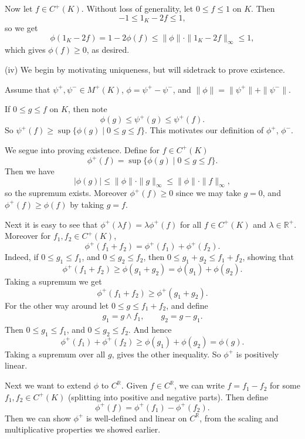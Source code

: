 \documentclass[12pt]{article}
\begin{document}
\begin{proofbox}
	Now let $f \in C^{+}(K)$. Without loss of generality, let $0 \leq f \leq 1$ on $K$. Then
	\[
	-1 \leq 1_K - 2f \leq 1,
	\]
	so we get
	\[
	\phi(1_K - 2f) = 1 - 2 \phi(f) \leq \|\phi\| \cdot \|1_K - 2f\|_\infty \leq 1,
	\]
	which gives $\phi(f) \geq 0$, as desired.

	(iv) We begin by motivating uniqueness, but will sidetrack to prove existence.

	Assume that $\psi^+, \psi^- \in M^{+}(K)$, $\phi = \psi^{+} - \psi^{-}$, and $\|\phi\| = \|\psi^{+}\| + \|\psi^{-}\|$.

	If $0 \leq g \leq f$ on $K$, then note
	\[
	\phi(g) \leq \psi^{+}(g) \leq \psi^{+}(f).
	\]
	So $\psi^{+}(f) \geq \sup\{\phi(g) \mid 0 \leq g \leq f\}$. This motivates our definition of $\phi^{+}$, $\phi^{-}$.

	We segue into proving existence. Define for $f \in C^{+}(K)$ 
	\[
		\phi^{+}(f) = \sup \{\phi(g) \mid 0 \leq g \leq f\}.
	\]
	Then we have
	\[
	|\phi(g)| \leq \|\phi\| \cdot \|g\|_\infty \leq \|\phi\| \cdot \|f\|_\infty,
	\]
	so the supremum exists. Moreover $\phi^{+}(f) \geq 0$ since we may take $g = 0$, and $\phi^{+}(f) \geq \phi(f)$ by taking $g = f$.

	Next it is easy to see that $\phi^{+}(\lambda f) = \lambda \phi^{+}(f)$ for all $f \in C^{+}(K)$ and $\lambda \in \mathbb{R}^+$. Moreover for $f_1, f_2 \in C^{+}(K)$,
	\[
	\phi^{+}(f_1 + f_2) = \phi^{+}(f_1) + \phi^{+}(f_2).
	\]
	Indeed, if $0 \leq g_1 \leq f_1$, and $0 \leq g_2 \leq f_2$, then $0 \leq g_1 + g_2 \leq f_1 + f_2$, showing that
	\[
	\phi^{+}(f_1 + f_2) \geq \phi(g_1 + g_2) = \phi(g_1) + \phi(g_2).
	\]
	Taking a supremum we get
	\[
	\phi^{+}(f_1 + f_2) \geq \phi^{+}(g_1 + g_2).
	\]
	For the other way around let $0 \leq g \leq f_1 + f_2$, and define
	\begin{align*}
		g_1 = g \wedge f_1, \qquad g_2 = g - g_1.
	\end{align*}
	Then $0 \leq g_1 \leq f_1$, and $0 \leq g_2 \leq f_2$. And hence
	\[
	\phi^{+}(f_1) + \phi^{+}(f_2) \geq \phi(g_1) + \phi(g_2) = \phi(g).
	\]
	Taking a supremum over all $g$, gives the other inequality. So $\phi^{+}$ is positively linear.

	Next we want to extend $\phi$ to $C^{\mathbb{R}}$. Given $f \in C^{\mathbb{R}}$, we can write $f = f_1 - f_2$ for some $f_1, f_2 \in C^{+}(K)$ (splitting into positive and negative parts). Then define
	\[
	\phi^{+}(f) = \phi^{+}(f_1) - \phi^{+}(f_2).
	\]
	Then we can show $\phi^{+}$ is well-defined and linear on $C^{\mathbb{R}}$, from the scaling and multiplicative properties we showed earlier.


\end{proofbox}
\end{document}
